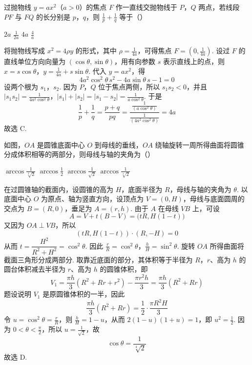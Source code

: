 \begin{problem}
过抛物线 \(y=ax^{2}\)（\(a>0\)）的焦点 \(F\) 作一直线交抛物线于 \(P\)，\(Q\) 两点，若线段 \(PF\) 与 \(FQ\) 的长分别是 \(p\)，\(q\)，则 \(\frac{1}{p}+\frac{1}{q}\) 等于（\quad）

\choices
    {\(2a\)}
    {\(\frac{1}{2a}\)}
    {\(4a\)}
    {\(\frac{4}{a}\)}


\begin{solution}
将抛物线写成 \(x^2=4\rho y\) 的形式，其中 \(\rho=\frac{1}{4a}\)，可得焦点 \(F=\left(0,\frac{1}{4a}\right)\). 设过 \(F\) 的直线单位方向向量为 \((\cos\theta,\sin\theta)\)，用有向参数 \(s\) 表示直线上的点，则
\(x=s\cos\theta\)，\(y=\frac{1}{4a}+s\sin\theta\).
代入 \(y=ax^2\)，得
\[
4a^2\cos^2\theta\,s^2-4a\sin\theta\,s-1=0
\]
设两个根为 \(s_1\)，\(s_2\). 因为 \(P\)，\(Q\) 位于焦点两侧，所以 \(s_1s_2<0\)，并且
\(|s_1s_2|=\frac{1}{4a^2\cos^2\theta}\)，\(|s_1|+|s_2|=|s_1-s_2|=\frac{1}{a\cos^2\theta}\).
于是
\[
\frac1p+\frac1q=\frac{p+q}{pq}=\frac{\frac{1}{(a\cos^2\theta)}}{\frac{1}{(4a^2\cos^2\theta)}}=4a
\]
故选 C.
\end{solution}
\end{problem}

\begin{problem}
如图，\(OA\) 是圆锥底面中心 \(O\) 到母线的垂线，\(OA\) 绕轴旋转一周所得曲面将圆锥分成体积相等的两部分，则母线与轴的夹角为（\quad）


\choices
    {\(\arccos\frac{1}{\sqrt[3]{2}}\)}
    {\(\arccos\frac{1}{2}\)}
    {\(\arccos\frac{1}{\sqrt{2}}\)}
    {\(\arccos\frac{1}{\sqrt[4]{2}}\)}


\begin{solution}
在过圆锥轴的截面内，设圆锥的高为 \(H\)，底面半径为 \(R\)，母线与轴的夹角为 \(\theta\). 以底面中心 \(O\) 为原点、轴为竖直方向，设顶点为 \(V=(0,H)\)，母线与底面圆周的交点为 \(B=(R,0)\)，垂足为 \(A=(r,h)\). 由于 \(A\) 在母线 \(VB\) 上，可设
\[
A=V+t(B-V)=\bigl(tR,H(1-t)\bigr)
\]
又因为 \(OA\perp VB\)，所以
\[
(tR,H(1-t))\cdot(R,-H)=0
\]
从而 \(t=\dfrac{H^2}{R^2+H^2}=\cos^2\theta\). 因此
\(\frac{r}{R}=\cos^2\theta\)，\(\frac{h}{H}=\sin^2\theta\).
旋转 \(OA\) 所得曲面将截面三角形分成两部分. 取靠近底面的部分，其体积等于半径为 \(R\)，\(r\)、高为 \(h\) 的圆台体积减去半径为 \(r\)、高为 \(h\) 的圆锥体积，即
\[
V_1=\frac{\pi h}{3}(R^2+Rr+r^2)-\frac{\pi r^2h}{3}=\frac{\pi h}{3}(R^2+Rr)
\]
题设说明 \(V_1\) 是原圆锥体积的一半，因此
\[
\frac{\pi h}{3}(R^2+Rr)=\frac12\cdot\frac{\pi R^2H}{3}
\]
令 \(u=\cos^2\theta=\frac{r}{R}\)，则 \(\frac{h}{H}=1-u\)，从而 \(2(1-u)(1+u)=1\)，即 \(u^2=\frac12\). 因为 \(0<\theta<\frac{\pi}{2}\)，所以 \(u=\frac1{\sqrt2}\)，故
\[
\cos\theta=\frac1{\sqrt[4]{2}}
\]
故选 D.
\end{solution}
\end{problem}

